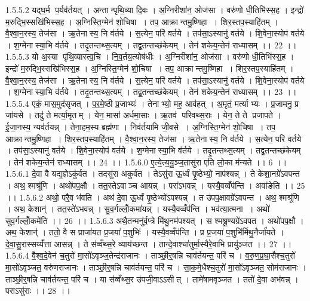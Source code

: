 1.5.5.2
यद्घ॒र्म प॒र्यव॑र्तयत् । अन्तान्पृथि॒व्या दि॒वः । अ॒ग्निरीशा॑न॒ ओज॑सा । वरु॑णो धी॒तिभि॑स्स॒ह । इन्द्रो॑ म॒रुद्भि॒स्सखि॑भिस्स॒ह । अ॒ग्निस्ति॒ग्मेन॑ शो॒चिषा । तप॒ आक्रान्तमु॒ष्णिहा । शिर॒स्तप॒स्याहि॑तम् । वै॒श्वा॒न॒रस्य॒ तेज॑सा । ऋ॒तेनास्य॒ नि व॑र्तये । स॒त्येन॒ परि॑ वर्तये । तप॑सा॒ऽस्यानु॑ वर्तये । शि॒वेना॒स्योप॑ वर्तये । श॒ग्मेनास्या॒भि व॑र्तये । तदृ॒तन्तथ्स॒त्यम् । तद्व्र॒तन्तच्छ॑केयम् । तेन॑ शकेय॒न्तेन॑ राध्यासम् ।। 22 ।।
1.5.5.3
यो अ॒स्या पृ॑थि॒व्यास्त्व॒चि । नि॒व॒र्तय॒त्योष॑धीः । अ॒ग्निरीशा॑न॒ ओज॑सा । वरु॑णो धी॒तिभि॑स्स॒ह । इन्द्रो॑ म॒रुद्भि॒स्सखि॑भिस्स॒ह । अ॒ग्निस्ति॒ग्मेन॑ शो॒चिषा । तप॒ आक्रान्तमु॒ष्णिहा । शिर॒स्तप॒स्याहि॑तम् । वै॒श्वा॒न॒रस्य॒ तेज॑सा । ऋ॒तेनास्य॒ नि व॑र्तये । स॒त्येन॒ परि॑ वर्तये । तप॑सा॒ऽस्यानु॑ वर्तये । शि॒वेना॒स्योप॑ वर्तये । श॒ग्मेनास्या॒भि व॑र्तये । तदृ॒तन्तथ्स॒त्यम् । तद्व्र॒तन्तच्छ॑केयम् । तेन॑ शकेय॒न्तेन॑ राध्यासम् ।। 23 ।।
1.5.5.4
एकं॒ मास॒मुद॑सृजत् । प॒र॒मे॒ष्ठी प्र॒जाभ्यः॑ । तेनाभ्यो॒ मह॒ आव॑हत् । अ॒मृतं॒ मर्त्याभ्यः । प्र॒जामनु॒ प्र जा॑यसे । तदु॑ ते मर्त्या॒मृतम् । येन॒ मासा॑ अर्धमा॒साः । ऋ॒तव॑ परिवथ्स॒राः । येन॒ ते ते प्रजापते । ई॒जा॒नस्य॒ न्यव॑र्तयन्न् । तेना॒हम॒स्य ब्रह्म॑णा । निव॑र्तयामि जी॒वसे । अ॒ग्निस्ति॒ग्मेन॑ शो॒चिषा । तप॒ आक्रान्तमु॒ष्णिहा । शिर॒स्तप॒स्याहि॑तम् । वै॒श्वा॒न॒रस्य॒ तेज॑सा । ऋ॒तेनास्य॒ नि व॑र्तये । स॒त्येन॒ परि॑ वर्तये । तप॑सा॒ऽस्यानु॑ वर्तये । शि॒वेना॒स्योप॑ वर्तये । श॒ग्मेनास्या॒भि व॑र्तये । तदृ॒तन्तथ्स॒त्यम् । तद्व्र॒तन्तच्छ॑केयम् । तेन॑ शकेय॒न्तेन॑ राध्यासम् ।। 24 ।।
1.5.6.0
ए॒त्ये॒त्य॒यु॒ञ्ज॒तासु॑रा एति लो॒का म॑न्यते ।। 6 ।।
1.5.6.1
दे॒वा वै यद्य॒ज्ञेऽकु॑र्वत । तदसु॑रा अकुर्वत । तेऽसु॑रा ऊ॒र्ध्वं पृ॒ष्ठेभ्यो॒ नाप॑श्यन्न् । ते केशा॒नग्रे॑ऽवपन्त । अथ॒ श्मश्रू॑णि । अथो॑पप॒क्षौ । तत॒स्तेऽवाञ्च आयन्न् । परा॑ऽभवन्न् । यस्यै॒वव्वँप॑न्ति । अवा॑ङेति ।। 25 ।।
1.5.6.2
अथो॒ परै॒व भ॑वति । अथ॑ दे॒वा ऊ॒र्ध्वं पृ॒ष्ठेभ्यो॑ऽपश्यन्न् । त उ॑पप॒क्षावग्रे॑ऽवपन्त । अथ॒ श्मश्रू॑णि । अथ॒ केशान्॑ । तत॒स्ते॑ऽभवन्न् । सु॒व॒र्गल्लोँ॒कमा॑यन्न् । यस्यै॒वव्वँप॑न्ति । भव॑त्या॒त्मना । अथो॑ सुव॒र्गल्लोँ॒कमे॑ति ।। 26 ।।
1.5.6.3
अथै॒तन्मनु॑र्व॒प्त्रे मि॑थु॒नम॑पश्यत् । स श्मश्रू॒ण्यग्रे॑ऽवपत । अथो॑पप॒क्षौ । अथ॒ केशान्॑ । ततो॒ वै स प्राजा॑यत प्र॒जया॑ प॒शुभिः॑ । यस्यै॒वव्वँप॑न्ति । प्र प्र॒जया॑ प॒शुभि॑र्मिथु॒नैर्जा॑यते । दे॒वा॒सु॒रास्सय्यँ॑त्ता आसन्न् । ते स॑व्वँथ्स॒रे व्याय॑च्छन्त । तान्दे॒वाश्चा॑तुर्मा॒स्यैरे॒वाभि प्रायु॑ञ्जत ।। 27 ।।
1.5.6.4
वै॒श्व॒दे॒वेन॑ च॒तुरो॑ मा॒सो॑ऽवृञ्ज॒तेन्द्र॑राजानः । ताञ्छी॒र्॒षन्नि चाव॑र्तयन्त॒ परि॑ च । व॒रु॒ण॒प्र॒घा॒सैश्च॒तुरो॑ मा॒सो॑ऽवृञ्जत॒ वरु॑णराजानः । ताञ्छी॒र्॒षन्नि चाव॑र्तयन्त॒ परि॑ च । सा॒क॒मे॒धैश्च॒तुरो॑ मा॒सो॑ऽवृञ्जत॒ सोम॑राजानः । ताञ्छी॒र्॒षन्नि चाव॑र्तयन्त॒ परि॑ च । या स॑व्वँथ्स॒र उ॑पजी॒वाऽऽसीत् । तामे॑षामवृञ्जत । ततो॑ दे॒वा अभ॑वन्न् । पराऽसु॑राः ।। 28 ।।
